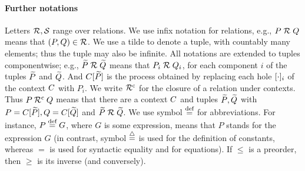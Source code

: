 \paragraph{Further notations}
Letters  ${\cal R},{\cal S}$ range over relations.
We use infix notation for relations, e.g., 
$P \mathrel{\cal R} Q$ means that $(P,Q) \in {\cal R}$.
We use a tilde to denote a tuple, with countably many elements; thus
the tuple may also be infinite.
 All
notations  are  extended to tuples componentwise;
e.g., $\widetilde P \mathrel{\cal R} \widetilde Q$ means that $P_i \mathrel{\cal R} Q_i$, for  each  
component $i$  of the tuples $\widetilde P$ and $\widetilde Q$.
And $C [\widetilde P]$ is the process obtained by replacing each hole
$[\cdot]_{i}$ of the  context $C$ with $P_i$.  
We write $
{\cal R}^{\rm{c}}$ for the closure of a relation under contexts. Thus $P\: {\cal R}^{\rm{c}}\: Q$
means that there are a context $C$ and tuples $\widetilde P,\widetilde Q$ with
$P =  C [\widetilde P], Q =  C [\widetilde Q]$ and    $\widetilde P \mathrel{\cal R} \widetilde Q$.
We use  symbol 
$\stackrel{\mbox{\scriptsize def}}{=}$ for abbreviations. For instance, $P \stackrel{\mbox{\scriptsize def}}{=} G $, where
$G$ is some expression, means that  $P$ stands
for the  expression
$G$ (in contrast,  symbol $\stackrel{\mbox{\scriptsize $\triangle$}}{=}$ is used for the definition of
constants, whereas   $=$ is used for syntactic equality and for equations).
If $\leq$ is a preorder, then  $\geq$  is its inverse (and
conversely).    
